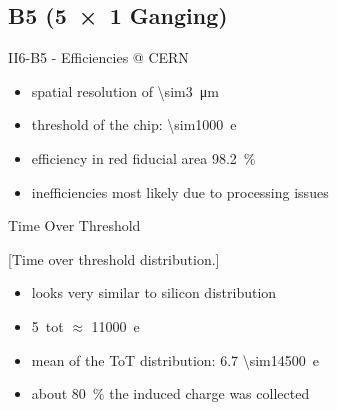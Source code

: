\subsection{B5 (\SI{5x1}{} Ganging)}
\begin{frame}{II6-B5 - Efficiencies @ CERN}

	
	\begin{itemize}\itemfill
		\item spatial resolution of \SI{\sim3}{\micro\meter}
		\item threshold of the chip: \SI{\sim1000}{e}
		\item efficiency in red fiducial area \SI{98.2}{\%}
		\item inefficiencies most likely due to processing issues
	\end{itemize}
	
\end{frame}
\begin{frame}{Time Over Threshold}

	[Time over threshold distribution.]	
	
	\begin{itemize}\itemfill
		\item looks very similar to silicon distribution
		\item \SI{5}{tot} $\approx$ \SI{11000}{e}
		\item mean of the ToT distribution: 6.7 \ra \SI{\sim14500}{e}
		\item about \SI{80}{\%} the induced charge was collected
	\end{itemize}
	
\end{frame}
